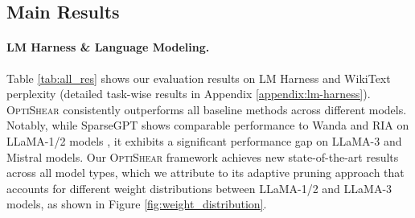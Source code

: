 \subsection{Main Results}
\paragraph{LM Harness \& Language Modeling.}
Table \ref{tab:all_res} shows our evaluation results on LM Harness and WikiText perplexity (detailed task-wise results in Appendix \ref{appendix:lm-harness}). \textsc{OptiShear} consistently outperforms all baseline methods across different models. Notably, while SparseGPT shows comparable performance to Wanda and RIA on LLaMA-1/2 models \citep{sun2023simple}, it exhibits a significant performance gap on LLaMA-3 and Mistral models. Our \textsc{OptiShear} framework achieves new state-of-the-art results across all model types, which we attribute to its adaptive pruning approach that accounts for different weight distributions between LLaMA-1/2 and LLaMA-3 models, as shown in Figure \ref{fig:weight_distribution}.
